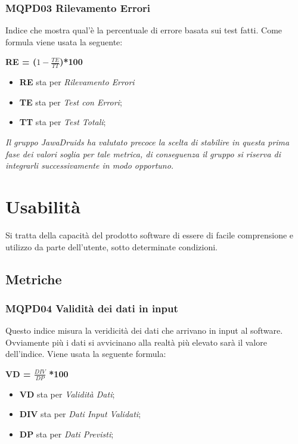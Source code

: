 \subsubsection{MQPD03 Rilevamento Errori} \label{3.2.1.1}
Indice che mostra qual’è la percentuale di errore basata sui test fatti. Come formula viene usata la seguente:
\begin{center}
	\textbf{RE = ($1-\frac{TE}{TT}$)*100}
\end{center}
\begin{itemize}
	\item \textbf{RE} sta per \textit{Rilevamento Errori}
	\item \textbf{TE} sta per \textit{Test con Errori};
	\item \textbf{TT} sta per \textit{Test Totali};
\end{itemize}
\textit{Il gruppo JawaDruids ha valutato precoce la scelta di stabilire in questa prima fase dei valori soglia per tale metrica, di conseguenza il gruppo si riserva di integrarli successivamente in modo opportuno.}

\section{Usabilità} \label{3.3}
Si tratta della capacità del prodotto software di essere di facile comprensione e utilizzo da parte dell’utente, sotto determinate condizioni. 
\subsection{Metriche} \label{3.3.1}
\subsubsection{MQPD04 Validità dei dati in input} \label{3.3.1.1}
Questo indice misura la veridicità dei dati che arrivano in input al software. Ovviamente più i dati si avvicinano alla realtà più elevato sarà il valore dell’indice.
Viene usata la seguente formula:
\begin{center}
	\textbf{VD = $\frac{DIV}{DP}$ *100}
\end{center}
\begin{itemize}
	\item \textbf{VD} sta per \textit{Validità Dati};
	\item \textbf{DIV} sta per \textit{Dati Input Validati};
	\item \textbf{DP} sta per \textit{Dati Previsti};
\end{itemize}

